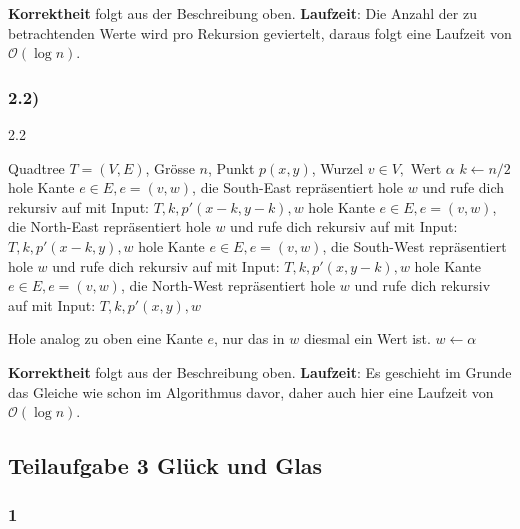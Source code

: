 \documentclass[a4paper, fontsize=10pt]{scrartcl}
\begin{document}
\textbf{Korrektheit} folgt aus der Beschreibung oben. \textbf{Laufzeit}: 
Die Anzahl der zu betrachtenden Werte wird pro Rekursion geviertelt, daraus folgt eine Laufzeit von $\mathcal{O}(\log n)$. 

\subsubsection*{2.2)}

\begin{algorithm}[H]
  \caption{2.2}
    \begin{algorithmic}
        \REQUIRE Quadtree $T=(V,E)$, Grösse $n$, Punkt $p(x,y)$, Wurzel $v\in V,$ Wert $\alpha$
        \STATE $k \leftarrow n/2$
                      \STATE hole Kante $e\in E,e=(v,w)$, die South-East repräsentiert
                      \STATE hole $w$ und rufe dich rekursiv auf mit Input: $T, k, p'(x-k,y-k),w$
                    \ELSE
                      \STATE hole Kante $e\in E,e=(v,w)$, die North-East repräsentiert
                      \STATE hole $w$ und rufe dich rekursiv auf mit Input: $T, k, p'(x-k,y),w$       
                    \ENDIF
                \ELSE
                      \STATE hole Kante $e\in E,e=(v,w)$, die South-West repräsentiert
                      \STATE hole $w$ und rufe dich rekursiv auf mit Input: $T, k, p'(x,y-k),w$
                    \ELSE
                      \STATE hole Kante $e\in E,e=(v,w)$, die North-West repräsentiert
                      \STATE hole $w$ und rufe dich rekursiv auf mit Input: $T, k, p'(x,y),w$
                    \ENDIF
                \ENDIF
        
          \ENDWHILE
    \STATE Hole analog zu oben eine Kante $e$, nur das in $w$ diesmal ein Wert ist.
    \STATE $w \leftarrow \alpha$
    \end{algorithmic}
\end{algorithm}

\textbf{Korrektheit} folgt aus der Beschreibung oben. \textbf{Laufzeit}: 
Es geschieht im Grunde das Gleiche wie schon im Algorithmus davor, daher auch hier eine Laufzeit von $\mathcal{O}(\log n)$.

\subsection*{Teilaufgabe 3 Glück und Glas}
\subsubsection*{1}
\end{document}
